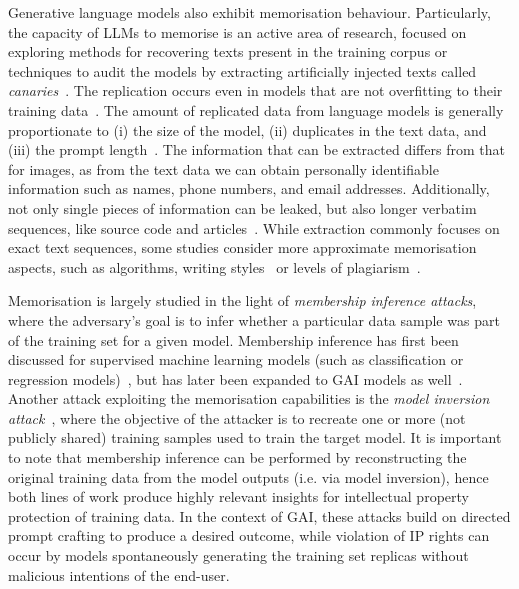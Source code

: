 \documentclass[conference,table]{IEEEtran}
\begin{document}
Generative language models also exhibit memorisation behaviour. Particularly, the capacity of LLMs to memorise is an active area of research, focused on exploring methods for recovering texts present in the training corpus or techniques to audit the models by extracting artificially injected texts called \textit{canaries}~\cite{carlini_secret_2019}. The replication occurs even in models that are not overfitting to their training data~\cite{tirumala_memorization_2022,jagielski_measuring_2023}. 
The amount of replicated data from language models is generally proportionate to (i) the size of the model, (ii) duplicates in the text data, and (iii) the prompt length~\cite{carlini_quantifying_2023,carlini_extracting_2021}. The information that can be extracted differs from that for images, as from the text data we can obtain personally identifiable information such as names, phone numbers, and email addresses. Additionally, not only single pieces of information can be leaked, but also longer verbatim sequences, like source code and articles~\cite{carlini_extracting_2021}. While extraction commonly focuses on exact text sequences, some studies consider more approximate memorisation aspects, such as algorithms, writing styles~\cite{hartmann_sok_2023} or levels of plagiarism~\cite{lee_language_2023}.



Memorisation is largely studied in the light of \textit{membership inference attacks}, where the adversary's goal is to infer whether a particular data sample was part of the training set for a given model. Membership inference has first been discussed for supervised machine learning models (such as classification or regression models)~\cite{shokri_membership_2017}, but has later been expanded to GAI models as well~\cite{webster_this_2021,hu_membership_2023,matsumoto_membership_2023}.
Another attack exploiting the memorisation capabilities is the \textit{model inversion attack}~\cite{fredrikson_model_2015}, where the objective of the attacker is to recreate one or more (not publicly shared) training samples used to train the target model\cite{yin_dreaming_2020,ghiasi_plug-inversion_2022,carlini_extracting_2023}. 
It is important to note that membership inference can be performed by reconstructing the original training data from the model outputs (i.e. via model inversion), hence both lines of work produce highly relevant insights for intellectual property protection of training data.
In the context of GAI, these attacks build on directed prompt crafting to produce a desired outcome, while violation of IP rights can occur by models spontaneously generating the training set replicas without malicious intentions of the end-user.
\end{document}
